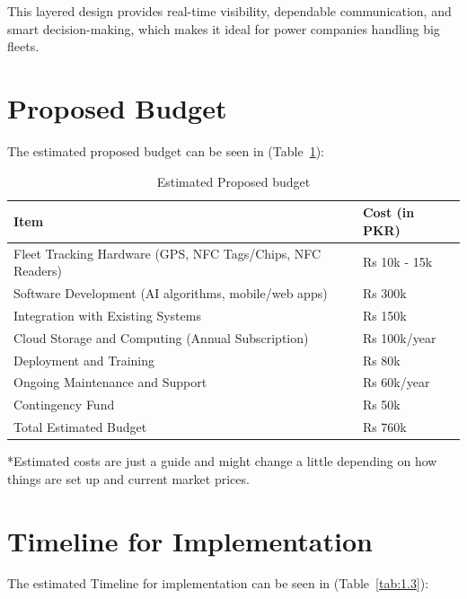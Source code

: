 This layered design provides real-time visibility, dependable communication, and smart decision-making, which makes it ideal for power companies handling big fleets.


\section{Proposed Budget}
The estimated proposed budget can be seen in (Table~\ref{tab:1.2}):
\begin{table}[H]
    \centering
    \caption{Estimated Proposed budget}
    \label{tab:1.2}
    \begin{tabular}{>{\raggedright\arraybackslash}p{8cm}>{\raggedright\arraybackslash}p{5cm}}
        \toprule
        \textbf{Item} & \textbf{Cost (in PKR)} \\
        \midrule
        Fleet Tracking Hardware (GPS, NFC Tags/Chips, NFC Readers) & Rs 10k - 15k \\
        Software Development (AI algorithms, mobile/web apps) & Rs 300k \\
        Integration with Existing Systems & Rs 150k \\
        Cloud Storage and Computing (Annual Subscription) & Rs 100k/year \\
        Deployment and Training & Rs 80k \\
        Ongoing Maintenance and Support & Rs 60k/year \\
        Contingency Fund & Rs 50k \\
        Total Estimated Budget & Rs 760k \\
        \bottomrule
    \end{tabular}
\end{table}

*Estimated costs are just a guide and might change a little depending on how things are set up and current market prices.

\section{Timeline for Implementation}
The estimated Timeline for implementation can be seen in (Table~\ref{tab:1.3}):

